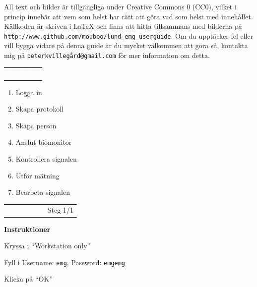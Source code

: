 \documentclass[10pt,a4paper]{article}
\newcommand*\circled[1]{\tikz[baseline=(char.base)]{
		\node[shape=circle,draw,minimum size=1em, inner sep=2pt] (char)
		{#1};}
}
\newcommand{\pagetitle}[2] {
	\begin{tabularx}{\linewidth}{>{\columncolor{darkpurple}}c >{\columncolor{lightpurple!35}}X}
		\LARGE \textcolor{white}{{#1}} & \LARGE {#2} \\[3pt]
	\end{tabularx}
}
\newenvironment{instructionsenv}
{
	\vspace{-4pt}
	\begin{purpleleftline}
		\vspace{2em}
		{\Large\bfseries{Instruktioner}}\par
		\vspace{1em}
	}
	{ 
	\end{purpleleftline}
}
\newcommand{\instruction}[2] {
	\textcolor{mycolor1}{\circled{\large {#1}}} 
	{\large #2}\par
}
\begin{document}
All text och bilder är tillgängliga under Creative Commons 0 (CC0), vilket i princip innebär att vem som helst har rätt att göra vad som helst med innehållet.
Källkoden är skriven i \LaTeX{} och finns att hitta tillsammans med bilderna på \verb|http://www.github.com/mouboo/lund_emg_userguide|. Om du upptäcker fel eller vill bygga vidare på denna guide är du mycket välkommen att göra så, kontakta mig på \verb|peterkvillegård@gmail.com| för mer information om detta.

\newpage


\pagetitle{Innehåll}{}\par
\vspace{3em}
{\Large

\begin{enumerate}[label={\Roman*},align=left]
\item Logga in 
\item Skapa protokoll 
\item Skapa person 
\item Anslut biomonitor 
\item Kontrollera signalen 
\item Utför mätning 
\item Bearbeta signalen 
\end{enumerate}
}

\newpage
{}


\pagetitle{I. Logga in}{Steg 1/1}

\begin{instructionsenv}
	\instruction{1}{Kryssa i ``Workstation only''}
	\instruction{2}{Fyll i Username: \texttt{emg}, Password: \texttt{emgemg}}
	\instruction{3}{Klicka på ``OK''}
\end{instructionsenv}

\vspace{50pt}
\end{document}
